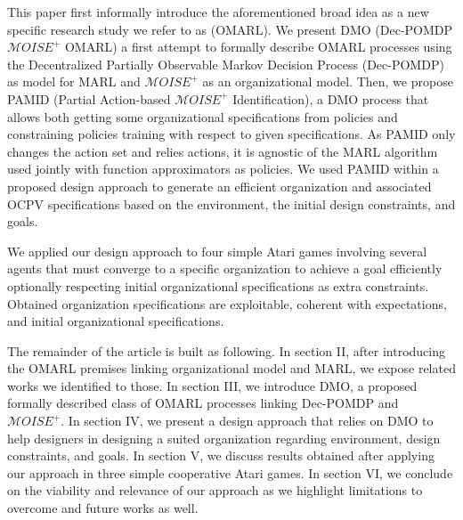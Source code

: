 \documentclass[runningheads]{llncs}
\begin{document}
This paper first informally introduce the aforementioned broad idea as a new specific research study we refer to as  (OMARL). We present DMO (Dec-POMDP $\mathcal{M}OISE^+$ OMARL) a first attempt to formally describe OMARL processes using the Decentralized Partially Observable Markov Decision Process (Dec-POMDP) as model for MARL and $\mathcal{M}OISE^+$ as an organizational model. Then, we propose PAMID (Partial Action-based $\mathcal{M}OISE^+$ Identification), a DMO process that allows both getting some organizational specifications from  policies and constraining policies training with respect to given specifications. As PAMID only changes the action set and relies  actions, it is agnostic of the MARL algorithm used jointly with function approximators as policies. We used PAMID within a proposed design approach to generate an efficient organization and associated OCPV specifications based on the environment, the initial design constraints, and goals.

We applied our design approach to four simple Atari games involving several agents that must converge to a specific organization to achieve a goal efficiently optionally respecting initial organizational specifications as extra constraints. Obtained organization specifications are exploitable, coherent with expectations, and initial organizational specifications.

The remainder of the article is built as following.
In section II, after introducing the OMARL premises linking organizational model and MARL, we expose related works we identified to those.
In section III, we introduce DMO, a proposed formally described class of OMARL processes linking Dec-POMDP and $\mathcal{M}OISE^+$.
In section IV, we present a design approach that relies on DMO to help designers in designing a suited organization regarding environment, design constraints, and goals.
In section V, we discuss results obtained after applying our approach in three simple cooperative Atari games.
In section VI, we conclude on the viability and relevance of our approach as we highlight limitations to overcome and future works as well.
\end{document}
